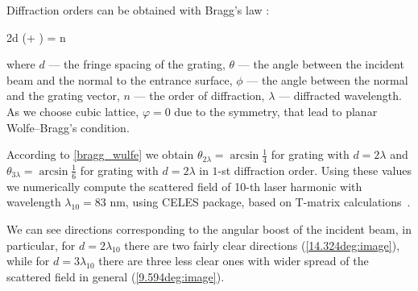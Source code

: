 \documentclass[conference]{IEEEtran}
\begin{document}
Diffraction orders can be obtained with Bragg's law \cite{kress_bernard}:

	\eq
		2d \sin(\theta + \varphi) = n\lambda
		\label{bragg_wulfe}
	\qe

\noindent where $d$ --- the fringe spacing of the grating, $\theta$ --- the angle between the incident beam and the normal to the entrance surface, $\phi$ --- the angle between the normal and the grating vector, $n$ --- the order of diffraction, $\lambda$ --- diffracted wavelength. As we choose cubic lattice, $\varphi = 0$ due to the symmetry, that lead to planar Wolfe–Bragg's condition.

According to \autoref{bragg_wulfe} we obtain $\theta_{2\lambda} = \arcsin\frac{1}{4}$ for grating with $d = 2\lambda$ and $\theta_{3\lambda} = \arcsin\frac{1}{6}$ for grating with $d = 2\lambda$ in $1$-st diffraction order. Using these values we numerically compute the scattered field of 10-th laser harmonic with wavelength $\lambda_{10} = 83$ nm, using CELES package, based on T-matrix calculations~\cite{t_matrix, celes}.

We can see directions corresponding to the angular boost of the incident beam, in particular, for $d = 2\lambda_{10}$ there are two fairly clear directions (\autoref{14.324deg:image}), while for $d = 3\lambda_{10}$ there are three less clear ones with wider spread of the scattered field in general (\autoref{9.594deg:image}).

\end{document}

